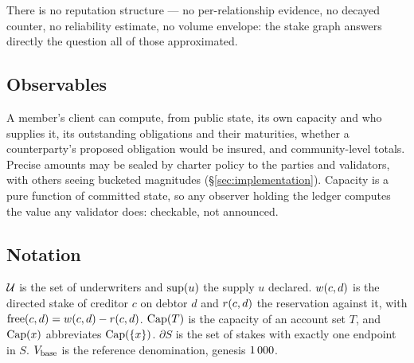 There is no reputation structure --- no per-relationship evidence, no decayed counter, no
reliability estimate, no volume envelope: the stake graph answers directly the question
all of those approximated.

\subsection{Observables}

A member's client can compute, from public state, its own capacity and who supplies it,
its outstanding obligations and their maturities, whether a counterparty's proposed
obligation would be insured, and community-level totals. Precise amounts may be sealed by
charter policy to the parties and validators, with others seeing bucketed magnitudes
(\S\ref{sec:implementation}). Capacity is a pure function of committed state, so any
observer holding the ledger computes the value any validator does: checkable, not
announced.

\subsection{Notation}

$\mathcal{U}$ is the set of underwriters and $\mathrm{sup}(u)$ the supply $u$ declared.
$w(c,d)$ is the directed stake of creditor $c$ on debtor $d$ and $r(c,d)$ the
reservation against it, with $\mathrm{free}(c,d)=w(c,d)-r(c,d)$. $\mathrm{Cap}(T)$ is the
capacity of an account set $T$, and $\mathrm{Cap}(x)$ abbreviates $\mathrm{Cap}(\{x\})$. $\partial S$
is the set of stakes with exactly one endpoint in $S$. $V_{\mathrm{base}}$ is the reference
denomination, genesis $1\,000$.
